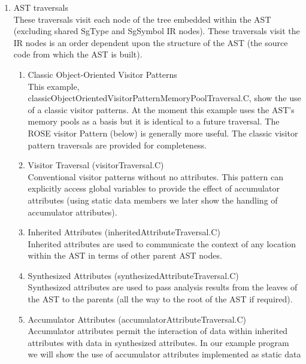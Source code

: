 \begin{itemize}
\begin{enumerate}
     \begin{enumerate}
        \item AST traversals \\
              These traversals visit each node of the tree embedded within the AST
              (excluding shared SgType and SgSymbol IR nodes).  These traversals
              visit the IR nodes is an order dependent upon the structure of the AST
              (the source code from which the AST is built).
        \begin{enumerate}
          \item Classic Object-Oriented Visitor Patterns \\
                This example, classicObjectOrientedVisitorPatternMemoryPoolTraversal.C,
                show the use of a classic visitor patterns.  At the moment this example
                uses the AST's memory pools as a basis but it is identical to a future
                traversal. The ROSE visitor Pattern (below) is generally more useful. 
                The classic visitor pattern traversals are provided for completeness.
          \item Visitor Traversal (visitorTraversal.C) \\
                Conventional visitor patterns without no attributes. This pattern can 
                explicitly access global variables to provide the effect of accumulator
                attributes (using static data members we later show the handling of
                accumulator attributes).
          \item Inherited Attributes (inheritedAttributeTraversal.C) \\
                Inherited attributes are used to communicate the context of any location
                within the AST in terms of other parent AST nodes.
          \item Synthesized Attributes (synthesizedAttributeTraversal.C) \\
                Synthesized attributes are used to pass analysis results from the leaves
                of the AST to the parents (all the way to the root of the AST if
                required).
          \item Accumulator Attributes (accumulatorAttributeTraversal.C) \\
                Accumulator attributes permit the interaction of data within inherited
                attributes with data in synthesized attributes. In our example program we
                will show the use of accumulator attributes implemented as static data

\end{enumerate}
\end{enumerate}
\end{enumerate}
\end{itemize}
